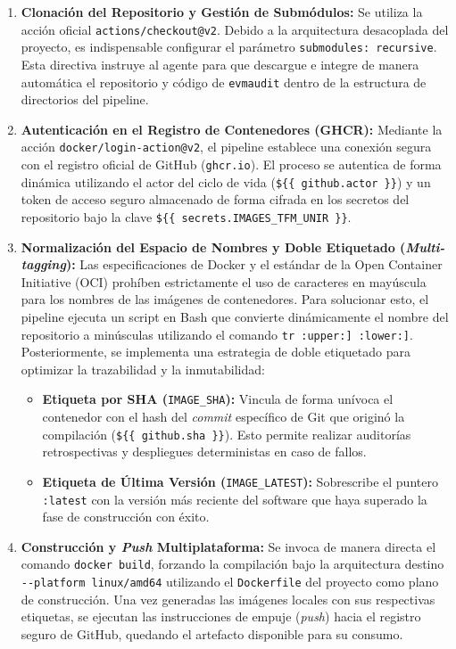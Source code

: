 \begin{enumerate}
\def\labelenumi{\arabic{enumi}.}
\item
  \textbf{Clonación del Repositorio y Gestión de Submódulos:} Se utiliza
  la acción oficial \texttt{actions/checkout@v2}. Debido a la
  arquitectura desacoplada del proyecto, es indispensable configurar el
  parámetro
  \texttt{submodules:\ \textquotesingle{}recursive\textquotesingle{}}.
  Esta directiva instruye al agente para que descargue e integre de
  manera automática el repositorio y código de \texttt{evmaudit} dentro
  de la estructura de directorios del pipeline.
\item
  \textbf{Autenticación en el Registro de Contenedores (GHCR):} Mediante
  la acción \texttt{docker/login-action@v2}, el pipeline establece una
  conexión segura con el registro oficial de GitHub (\texttt{ghcr.io}).
  El proceso se autentica de forma dinámica utilizando el actor del
  ciclo de vida (\texttt{\$\{\{\ github.actor\ \}\}}) y un token de
  acceso seguro almacenado de forma cifrada en los secretos del
  repositorio bajo la clave
  \texttt{\$\{\{\ secrets.IMAGES\_TFM\_UNIR\ \}\}}.
\item
  \textbf{Normalización del Espacio de Nombres y Doble Etiquetado
  (\emph{Multi-tagging}):} Las especificaciones de Docker y el estándar
  de la Open Container Initiative (OCI) prohíben estrictamente el uso de
  caracteres en mayúscula para los nombres de las imágenes de
  contenedores. Para solucionar esto, el pipeline ejecuta un script en
  Bash que convierte dinámicamente el nombre del repositorio a
  minúsculas utilizando el comando
  \texttt{tr\ \textquotesingle{}{[}:upper:{]}\textquotesingle{}\ \textquotesingle{}{[}:lower:{]}\textquotesingle{}}.
  Posteriormente, se implementa una estrategia de doble etiquetado para
  optimizar la trazabilidad y la inmutabilidad:

  \begin{itemize}
  \tightlist
  \item
    \textbf{Etiqueta por SHA (}\texttt{IMAGE\_SHA}\textbf{):} Vincula de
    forma unívoca el contenedor con el hash del \emph{commit} específico
    de Git que originó la compilación
    (\texttt{\$\{\{\ github.sha\ \}\}}). Esto permite realizar
    auditorías retrospectivas y despliegues deterministas en caso de
    fallos.
  \item
    \textbf{Etiqueta de Última Versión
    (}\texttt{IMAGE\_LATEST}\textbf{):} Sobrescribe el puntero
    \texttt{:latest} con la versión más reciente del software que haya
    superado la fase de construcción con éxito.
  \end{itemize}
\item
  \textbf{Construcción y \emph{Push} Multiplataforma:} Se invoca de
  manera directa el comando \texttt{docker\ build}, forzando la
  compilación bajo la arquitectura destino
  \texttt{-\/-platform\ linux/amd64} utilizando el \texttt{Dockerfile}
  del proyecto como plano de construcción. Una vez generadas las
  imágenes locales con sus respectivas etiquetas, se ejecutan las
  instrucciones de empuje (\emph{push}) hacia el registro seguro de
  GitHub, quedando el artefacto disponible para su consumo.
\end{enumerate}

